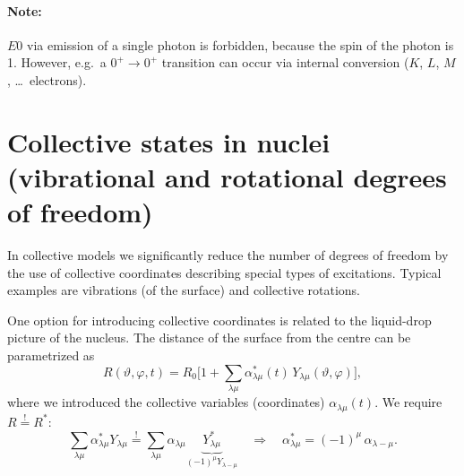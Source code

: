 \documentclass[11pt,a4paper]{article}
\begin{document}
\paragraph{Note:} $E0$ via emission of a single photon is forbidden, because the spin of the photon is 1. However, e.g.\ a $0^+\to0^+$ transition can occur via internal conversion ($K$, $L$, $M$, \dots\ electrons).

\section{Collective states in nuclei (vibrational and rotational degrees of freedom)}
In collective models we significantly reduce the number of degrees of freedom by the use of collective coordinates describing special types of excitations. Typical examples are vibrations (of the surface) and collective rotations.

One option for introducing collective coordinates is related to the liquid-drop picture of the nucleus. The distance of the surface from the centre can be parametrized as
\[
R(\vartheta,\varphi,t)=R_0\Big[1+\sum_{\lambda\mu}\alpha^*_{\lambda\mu}(t)\,Y_{\lambda\mu}(\vartheta,\varphi)\Big],
\]
where we introduced the collective variables (coordinates) $\alpha_{\lambda\mu}(t)$.
We require $R\overset{!}{=}R^*$:
\[
\sum_{\lambda\mu}\alpha^*_{\lambda\mu}Y_{\lambda\mu}\overset{!}{=}\sum_{\lambda\mu}\alpha_{\lambda\mu}\underbrace{Y^*_{\lambda\mu}}_{(-1)^\mu Y_{\lambda-\mu}}
\quad\Rightarrow\quad
\alpha^*_{\lambda\mu}=(-1)^\mu\,\alpha_{\lambda-\mu}.
\]
\end{document}
